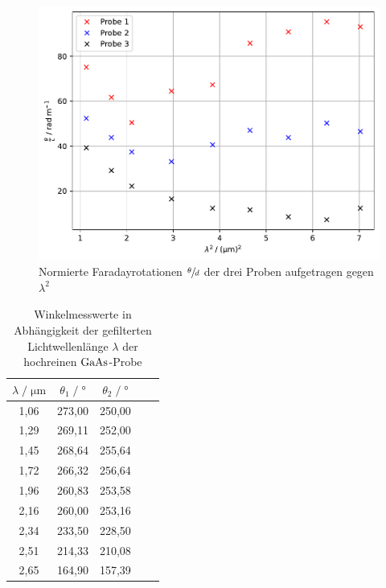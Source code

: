 \documentclass[
  bibliography=totoc,     %
  captions=tableheading,  %
  titlepage=firstiscover, %
]{scrartcl}
\begin{document}
\begin{figure}[H]
    \centering
    \includegraphics[scale=0.7]{build/winkel.pdf}
    \caption{Normierte Faradayrotationen $\sfrac{\theta}{d}$ der drei Proben aufgetragen gegen $\lambda^2$}
    \label{fig:plot2}
\end{figure}

\begin{table}
    \centering
    \caption{Winkelmesswerte in Abhängigkeit der gefilterten Lichtwellenlänge $\lambda$ 
        der hochreinen $\ce{GaAs}$-Probe}
    \label{tab:mess2}
    \begin{tabular}{c c c c c}
    \toprule
    $\lambda \;/\; \si{\micro\meter}$ & $\theta_1 \;/\; \si{\degree}$ &  $\theta_2 \;/\; \si{\degree}$\\
    \midrule
        1,06 & 273,00 & 250,00 \\
        1,29 & 269,11 & 252,00 \\
        1,45 & 268,64 & 255,64 \\
        1,72 & 266,32 & 256,64 \\
        1,96 & 260,83 & 253,58 \\
        2,16 & 260,00 & 253,16 \\
        2,34 & 233,50 & 228,50 \\
        2,51 & 214,33 & 210,08 \\
        2,65 & 164,90 & 157,39 \\
    \bottomrule
    \end{tabular}
\end{table}
\end{document}
